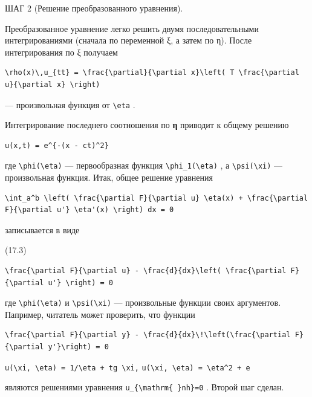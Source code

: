 \documentclass[
  ukrainian,
]{article}
\begin{document}
ШАГ 2 (Решение преобразованного уравнения).

Преобразованное уравнение легко решить двумя последовательными
интегрированиями (сначала по переменной ξ, а затем по η). После
интегрирования по ξ получаем

\begin{verbatim}
\rho(x)\,u_{tt} = \frac{\partial}{\partial x}\left( T \frac{\partial u}{\partial x} \right)
\end{verbatim}

--- произвольная функция от \texttt{\textbackslash{}eta} .

Интегрирование последнего соотношения по \textbf{η} приводит к общему
решению

\begin{verbatim}
u(x,t) = e^{-(x - ct)^2}
\end{verbatim}

где \texttt{\textbackslash{}phi(\textbackslash{}eta)} --- первообразная
функция \texttt{\textbackslash{}phi\_1(\textbackslash{}eta)} , а
\texttt{\textbackslash{}psi(\textbackslash{}xi)} --- произвольная
функция. Итак, общее решение уравнения

\begin{verbatim}
\int_a^b \left( \frac{\partial F}{\partial u} \eta(x) + \frac{\partial F}{\partial u'} \eta'(x) \right) dx = 0
\end{verbatim}

записывается в виде

(17.3)

\begin{verbatim}
\frac{\partial F}{\partial u} - \frac{d}{dx}\left( \frac{\partial F}{\partial u'} \right) = 0
\end{verbatim}

где \texttt{\textbackslash{}phi(\textbackslash{}eta)} и
\texttt{\textbackslash{}psi(\textbackslash{}xi)} --- произвольные
функции своих аргументов. Папример, читатель может проверить, что
функции

\begin{verbatim}
\frac{\partial F}{\partial y} - \frac{d}{dx}\!\left(\frac{\partial F}{\partial y'}\right) = 0
\end{verbatim}

\texttt{u(\textbackslash{}xi,\ \textbackslash{}eta)\ =\ 1/\textbackslash{}eta\ +\ tg\ \textbackslash{}xi,}
\texttt{u(\textbackslash{}xi,\ \textbackslash{}eta)\ =\ \textbackslash{}eta\^{}2\ +\ e}

являются решениями уравнения
\texttt{u\_\{\textbackslash{}mathrm\{\ \}nh\}=0} . Второй шаг сделан.
\end{document}
